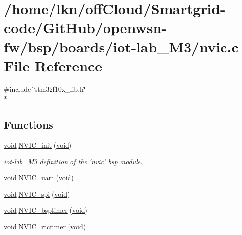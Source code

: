 \hypertarget{iot-lab___m3_2nvic_8c}{}\section{/home/lkn/off\+Cloud/\+Smartgrid-\/code/\+Git\+Hub/openwsn-\/fw/bsp/boards/iot-\/lab\+\_\+\+M3/nvic.c File Reference}
\label{iot-lab___m3_2nvic_8c}
{\ttfamily \#include \char`\"{}stm32f10x\+\_\+lib.\+h\char`\"{}}\\*
\subsection*{Functions}
\begin{DoxyCompactItemize}
\item 
\hyperlink{usb__devapi_8h_afabf60e7f57651d6d595a02c75f07cd0}{void} \hyperlink{iot-lab___m3_2nvic_8c_a1981672e898044e1f11c22e019e25823}{N\+V\+I\+C\+\_\+init} (\hyperlink{usb__devapi_8h_afabf60e7f57651d6d595a02c75f07cd0}{void})
\begin{DoxyCompactList}\small\item\em iot-\/lab\+\_\+\+M3 definition of the \char`\"{}nvic\char`\"{} bsp module. \end{DoxyCompactList}\item 
\hyperlink{usb__devapi_8h_afabf60e7f57651d6d595a02c75f07cd0}{void} \hyperlink{iot-lab___m3_2nvic_8c_a36190a9217bee6e01e42721f2d7276d5}{N\+V\+I\+C\+\_\+uart} (\hyperlink{usb__devapi_8h_afabf60e7f57651d6d595a02c75f07cd0}{void})
\item 
\hyperlink{usb__devapi_8h_afabf60e7f57651d6d595a02c75f07cd0}{void} \hyperlink{iot-lab___m3_2nvic_8c_a7681089016909b7696547e1533d5d298}{N\+V\+I\+C\+\_\+spi} (\hyperlink{usb__devapi_8h_afabf60e7f57651d6d595a02c75f07cd0}{void})
\item 
\hyperlink{usb__devapi_8h_afabf60e7f57651d6d595a02c75f07cd0}{void} \hyperlink{iot-lab___m3_2nvic_8c_a536b37a571b01eaef542b4cb9da4e14c}{N\+V\+I\+C\+\_\+bsptimer} (\hyperlink{usb__devapi_8h_afabf60e7f57651d6d595a02c75f07cd0}{void})
\item 
\hyperlink{usb__devapi_8h_afabf60e7f57651d6d595a02c75f07cd0}{void} \hyperlink{iot-lab___m3_2nvic_8c_aff46ffbf74b7562de23473f7429cc6c0}{N\+V\+I\+C\+\_\+rtctimer} (\hyperlink{usb__devapi_8h_afabf60e7f57651d6d595a02c75f07cd0}{void})
\item 

\end{DoxyCompactItemize}
